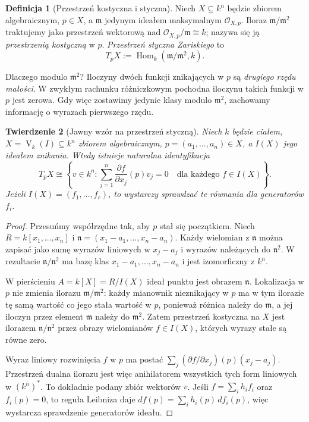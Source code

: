 \documentclass[11pt,a4paper,openany]{report}
\numberwithin{equation}{section}
\theoremstyle{plain}
\newtheorem{twierdzenie}{Twierdzenie}[section]
\theoremstyle{definition}
\newtheorem{definicja}[twierdzenie]{Definicja}
\theoremstyle{remark}
\newcommand{\V}{\operatorname V}
\begin{document}
\begin{definicja}[Przestrzeń kostyczna i styczna]
\label{def:tangent-zariski}
Niech $X\subseteq k^n$ będzie zbiorem algebraicznym,
$p\in X$, a $\mathfrak m$ jedynym ideałem maksymalnym
$\mathcal O_{X,p}$. Iloraz $\mathfrak m/\mathfrak m^2$
traktujemy jako przestrzeń wektorową nad
$\mathcal O_{X,p}/\mathfrak m\cong k$; nazywa się ją
\emph{przestrzenią kostyczną} w $p$.
\emph{Przestrzeń styczna Zariskiego} to
\[
 T_pX:=\operatorname{Hom}_k(\mathfrak m/\mathfrak m^2,k).
\]
\end{definicja}

Dlaczego modulo $\mathfrak m^2$? Iloczyny dwóch funkcji
znikających w $p$ są \emph{drugiego rzędu małości}.
W zwykłym rachunku różniczkowym pochodna iloczynu
takich funkcji w $p$ jest zerowa. Gdy więc zostawimy
jedynie klasy modulo $\mathfrak m^2$, zachowamy
informację o wyrazach pierwszego rzędu.

\begin{twierdzenie}[Jawny wzór na przestrzeń styczną]
\label{tw:zariski-tangent-formula}
Niech $k$ będzie ciałem, $X=\V_k(I)\subseteq k^n$
zbiorem algebraicznym, $p=(a_1,\dots,a_n)\in X$,
a $I(X)$ jego ideałem znikania. Wtedy istnieje
naturalna identyfikacja
\[
 T_pX\cong\left\{v\in k^n:
 \sum_{j=1}^n\frac{\partial f}{\partial x_j}(p)v_j=0
 \quad\text{dla każdego }f\in I(X)\right\}.
\]
Jeżeli $I(X)=(f_1,\dots,f_r)$, to wystarczy sprawdzać
te równania dla generatorów $f_i$.
\end{twierdzenie}
\begin{proof}
Przesuńmy współrzędne tak, aby $p$ stał się początkiem.
Niech $R=k[x_1,\dots,x_n]$ i
$\mathfrak n=(x_1-a_1,\dots,x_n-a_n)$.
Każdy wielomian z $\mathfrak n$ można zapisać jako
sumę wyrazów liniowych w $x_j-a_j$ i wyrazów należących
do $\mathfrak n^2$. W rezultacie
$\mathfrak n/\mathfrak n^2$ ma bazę klas
$x_1-a_1,\dots,x_n-a_n$ i jest izomorficzny z $k^n$.

W pierścieniu $A=k[X]=R/I(X)$ ideał punktu jest obrazem
$\mathfrak n$. Lokalizacja w $p$ nie zmienia ilorazu
$\mathfrak m/\mathfrak m^2$: każdy mianownik nieznikający
w $p$ ma w tym ilorazie tę samą wartość co jego stała
wartość w $p$, ponieważ różnica należy do $\mathfrak m$,
a jej iloczyn przez element $\mathfrak m$ należy do
$\mathfrak m^2$. Zatem przestrzeń kostyczna na $X$
jest ilorazem $\mathfrak n/\mathfrak n^2$ przez obrazy
wielomianów $f\in I(X)$, których wyrazy stałe są równe zero.

Wyraz liniowy rozwinięcia $f$ w $p$ ma postać
$\sum_j(\partial f/\partial x_j)(p)(x_j-a_j)$.
Przestrzeń dualna ilorazu jest więc anihilatorem
wszystkich tych form liniowych w $(k^n)^*$.
To dokładnie podany zbiór wektorów $v$.
Jeśli $f=\sum_i h_if_i$ oraz $f_i(p)=0$, to
reguła Leibniza daje
$df(p)=\sum_i h_i(p)\,df_i(p)$, więc wystarcza
sprawdzenie generatorów ideału.
\end{proof}
\end{document}
